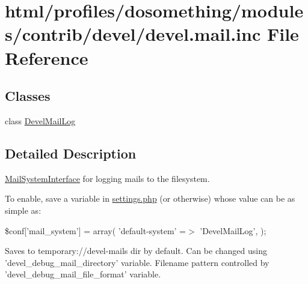 \hypertarget{devel_8mail_8inc}{
\section{html/profiles/dosomething/modules/contrib/devel/devel.mail.inc File Reference}
\label{devel_8mail_8inc}
}
\subsection*{Classes}
\begin{DoxyCompactItemize}
\item 
class \hyperlink{classDevelMailLog}{DevelMailLog}
\end{DoxyCompactItemize}


\subsection{Detailed Description}
\hyperlink{interfaceMailSystemInterface}{MailSystemInterface} for logging mails to the filesystem.

To enable, save a variable in \hyperlink{settings_8php}{settings.php} (or otherwise) whose value can be as simple as:

\$conf\mbox{[}'mail\_\-system'\mbox{]} = array( 'default-\/system' =$>$ 'DevelMailLog', );

Saves to temporary://devel-\/mails dir by default. Can be changed using 'devel\_\-debug\_\-mail\_\-directory' variable. Filename pattern controlled by 'devel\_\-debug\_\-mail\_\-file\_\-format' variable. 